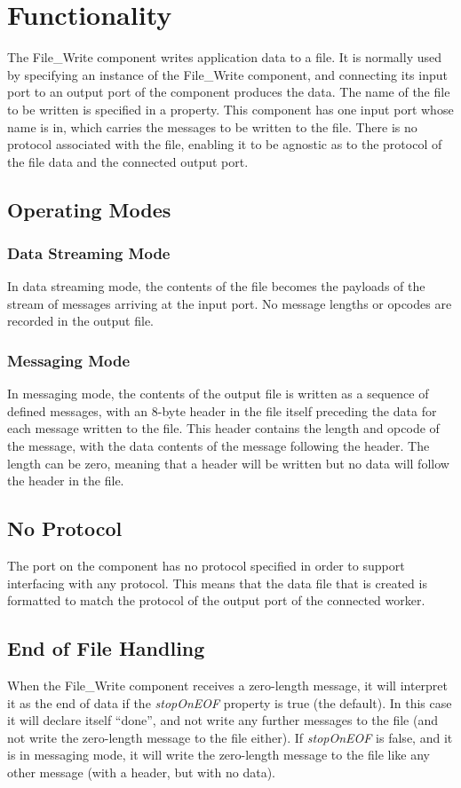 \documentclass{article}
\begin{document}
\section*{Functionality}
\begin{flushleft}
The File\_Write component writes application data to a file. It is normally used by
specifying an instance of the File\_Write component, and connecting its input port to an
output port of the component produces the data. The name of the file to be written is
specified in a property.
This component has one input port whose name is in, which carries the messages to
be written to the file. There is no protocol associated with the file, enabling it to be
agnostic as to the protocol of the file data and the connected output port.
\subsection*{Operating Modes}
\subsubsection*{Data Streaming Mode}
In data streaming mode, the contents of the file becomes the payloads of the stream of
messages arriving at the input port. No message lengths or opcodes are recorded in
the output file.
\subsubsection*{Messaging Mode}
In messaging mode, the contents of the output file is written as a sequence of defined
messages, with an 8-byte header in the file itself preceding the data for each message
written to the file. This header contains the length and opcode of the message, with the
data contents of the message following the header. The length can be zero, meaning
that a header will be written but no data will follow the header in the file.\\
\medskip \medskip 
 
\subsection*{No Protocol}
The port on the component has no protocol specified in order to support interfacing with any protocol.  This means that the data file that is created is formatted to match the protocol of the output port of the connected worker. 
\subsection*{End of File Handling}
When the File\_Write component receives a zero-length message, it will interpret it as
the end of data if the \textit{stopOnEOF} property is true (the default). In this case it will
declare itself ``done”, and not write any further messages to the file (and not write the
zero-length message to the file either). If \textit{stopOnEOF} is false, and it is in messaging mode, it will write the zero-length message to the file like any other message (with a
header, but with no data).
       
\end{flushleft}
\end{document}
